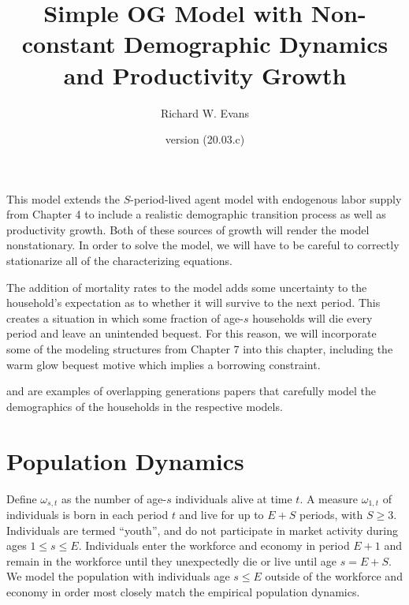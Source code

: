 \documentclass[letterpaper,12pt]{article}
\theoremstyle{definition}
\begin{document}
\title{Simple OG Model with Non-constant Demographic Dynamics and Productivity Growth}
\date{version (20.03.c)}
\author{Richard W. Evans}
\maketitle



This model extends the $S$-period-lived agent model with endogenous labor supply from Chapter 4 to include a realistic demographic transition process as well as productivity growth. Both of these sources of growth will render the model nonstationary. In order to solve the model, we will have to be careful to correctly stationarize all of the characterizing equations.

The addition of mortality rates to the model adds some uncertainty to the household's expectation as to whether it will survive to the next period. This creates a situation in which some fraction of age-$s$ households will die every period and leave an unintended bequest. For this reason, we will incorporate some of the modeling structures from Chapter 7 into this chapter, including the warm glow bequest motive which implies a borrowing constraint.

\citet{Nishiyama:2015} and \citet{DeBackerEtAl:2019} are examples of overlapping generations papers that carefully model the demographics of the households in the respective models.


\section{Population Dynamics}\label{SecPopDyn}

  Define $\omega_{s,t}$ as the number of age-$s$ individuals alive at time $t$. A measure $\omega_{1,t}$ of individuals is born in each period $t$ and live for up to $E+S$ periods, with $S\geq 3$. Individuals are termed ``youth'', and do not participate in market activity during ages $1\leq s\leq E$. Individuals enter the workforce and economy in period $E+1$ and remain in the workforce until they unexpectedly die or live until age $s=E+S$. We model the population with individuals age $s\leq E$ outside of the workforce and economy in order most closely match the empirical population dynamics.
\end{document}
